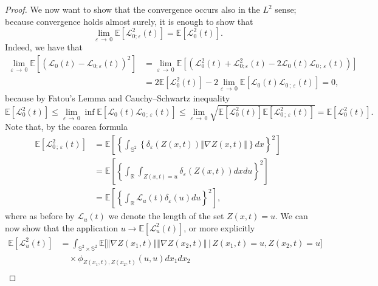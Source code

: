 \documentclass[10pt]{amsart}
\theoremstyle{definition}\newtheorem{defi}[theo]{Definition}\newtheorem{rema}[theo]{Remark}\newtheorem{exam}[theo]{Example}\newtheorem{exem}[theo]{Example}\newtheorem{nota}[theo]{Notation}
\newcommand{\clL}{\mathcal{L}}
\newcommand{\bbS}{\mathbb{S}}
\newcommand{\bbR}{\mathbb{R}}
\newcommand{\bbE}{\mathbb{E}}
\begin{document}
\begin{proof}
We now want to show that the convergence occurs also in the $L^{2}$ sense; because convergence holds almost surely, it is enough to show that
\begin{equation*}
\lim_{\varepsilon\,\rightarrow\,0}\bbE\left[\clL_{0;\varepsilon }^{2}(t)\right] =\bbE\left[\clL_{0}^{2}(t)\right] \text{.}
\end{equation*}
Indeed, we have that
\begin{align*}
\lim_{\varepsilon\,\rightarrow\,0}\bbE\left[\left(\clL_{0}(t)-\clL_{0;\varepsilon }(t)\right)^{2}\right] &=\lim_{\varepsilon\,
\rightarrow\,0}\bbE\left[\left(\clL_{0}^{2}(t)+\clL_{0;\varepsilon}^{2}(t)-2\clL_{0}(t)\clL_{0\,;\,\varepsilon}(t)
\right)\right] \\
&=2\bbE\left[\clL_{0}^{2}(t)\right] -2\lim_{\varepsilon
\,\rightarrow\,0}\bbE\left[\clL_{0}(t)\clL_{0\,;\,\varepsilon }(t)\right] =0\text{,}
\end{align*}
because by Fatou's Lemma and Cauchy--Schwartz inequality
\begin{equation*}
\bbE\left[\clL_{0}^{2}(t)\right] \leq \lim_{\varepsilon
\,\rightarrow\,0}\inf \bbE\left[\clL_{0}(t)\clL _{0\,;\,\varepsilon}(t)\right] \leq \lim_{\varepsilon\,\rightarrow\,0}\sqrt{
\bbE\left[\clL_{0}^{2}(t)\right] \bbE\left[\clL _{0\,;\,\varepsilon}^{2}(t)\right] }=\bbE\left[\clL_{0}^{2}(t)
\right] \text{.}
\end{equation*}
Note that, by the coarea formula
\begin{align*}
\bbE\left[\clL_{0\,;\,\varepsilon}^{2}(t)\right] &=\bbE
\left[\left\{\int_{\bbS^{2}}\left\{\delta_{\varepsilon }(Z(x,t))\left\Vert \nabla Z(x,t)\right\Vert \right\} dx\right\} ^{2}\right]
\\
&=\bbE\left[\left\{\int_{\bbR}\int_{Z(x,t)=u}\delta _{\varepsilon }(Z(x,t))dxdu\right\}^{2}\right] \\
&=\bbE\left[\left\{\int_{\bbR}\clL_{u}(t)\delta _{\varepsilon }(u)du\right\}^{2}\right] \text{,}
\end{align*}
where as before by $\clL_{u}(t)$ we denote the length of the set $ Z(x,t)=u.$ We can now show that the application $u\rightarrow \bbE
\left[\clL_{u}^{2}(t)\right] $, or more explicitly
\begin{align*}
\bbE\left[\clL_{u}^{2}(t)\right] &=\int_{\bbS^{2}\times
\bbS^{2}}\bbE\Big[ \left\Vert \nabla Z(x_{1},t)\right\Vert \left\Vert \nabla Z(x_{2},t)\right\Vert \,\Big|\, Z(x_{1},t)=u,Z(x_{2},t)=u\Big]\\
&\quad\times \phi _{Z(x_{1},t),Z(x_{2},t)}(u,u)dx_{1}dx_{2}\\

\end{align*}
\end{proof}
\end{document}
